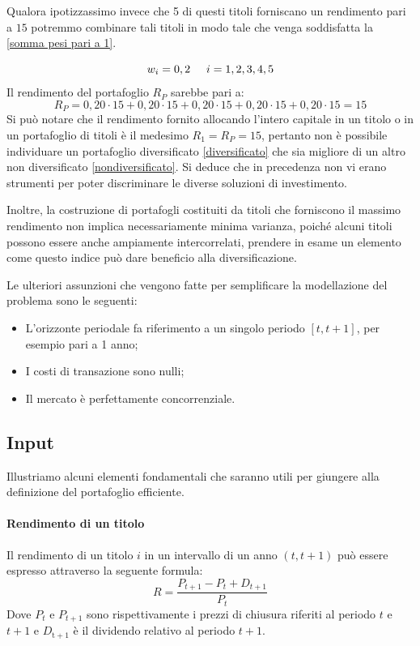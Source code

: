Qualora ipotizzassimo invece che 5 di questi titoli forniscano un rendimento pari a $15$ potremmo combinare tali titoli in modo tale che venga soddisfatta la \ref{somma pesi pari a 1}.

\begin{equation}
w_i=0,2 \hspace{0,5cm} i={1,2,3,4,5} 
\end{equation}
Il rendimento del portafoglio $R_P$ sarebbe pari a: 
\begin{equation}
\label{diversificato}
R_P=0,20\cdot15+0,20\cdot 15+0,20\cdot15+0,20\cdot15+0,20\cdot15 = 15
\end{equation}
Si può notare che il rendimento fornito allocando l'intero capitale in un titolo o in un portafoglio di titoli è il medesimo $R_1=R_P=15$, pertanto non è possibile individuare un portafoglio diversificato \ref{diversificato} che sia migliore di un altro non diversificato \ref{nondiversificato}. Si deduce che in precedenza non vi erano strumenti per poter discriminare le diverse soluzioni di investimento.

Inoltre, la costruzione di portafogli costituiti da titoli che forniscono il massimo rendimento non implica necessariamente minima varianza, poiché alcuni titoli possono essere anche ampiamente intercorrelati, prendere in esame un elemento come questo indice può dare beneficio alla diversificazione.  

Le ulteriori assunzioni che vengono fatte per semplificare la modellazione del problema sono le seguenti:
\begin{itemize}
	\item L'orizzonte periodale fa riferimento a un singolo periodo $[t,t+1]$, per esempio pari a 1 anno;
	\item I costi di transazione sono nulli;
	\item Il mercato è perfettamente concorrenziale.
\end{itemize}

\subsection{Input} Illustriamo alcuni elementi fondamentali che saranno utili per giungere alla definizione del portafoglio efficiente.
\paragraph{Rendimento di un titolo}

Il rendimento di un titolo $i$ in un intervallo di un anno $(t, t+1)$ può essere espresso attraverso la seguente formula: 
\begin{equation}\label{key}
{R} = \frac{P_{t+1} -P_{t} + D_{t+1}}{P_{t}}
\end{equation}
Dove $P_{t}$ e $P_{t+1}$ sono rispettivamente i prezzi di chiusura riferiti al periodo $t$ e $t+1$ e $D_\mathrm{t+1}$ è il dividendo relativo al periodo $t+1$.

